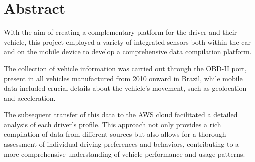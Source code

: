 \chapter*{Abstract}


With the aim of creating a complementary platform for the driver and their vehicle, this project employed a variety of integrated sensors both within the car and on the mobile device to develop a comprehensive data compilation platform.

The collection of vehicle information was carried out through the OBD-II port, present in all vehicles manufactured from 2010 onward in Brazil, while mobile data included crucial details about the vehicle's movement, such as geolocation and acceleration.

The subsequent transfer of this data to the AWS cloud facilitated a detailed analysis of each driver's profile. This approach not only provides a rich compilation of data from different sources but also allows for a thorough assessment of individual driving preferences and behaviors, contributing to a more comprehensive understanding of vehicle performance and usage patterns.

